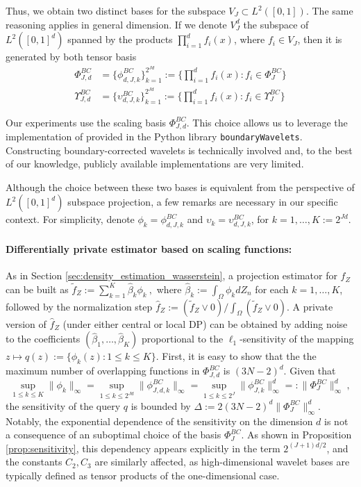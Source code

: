 \documentclass{article}
\newcommand{\1}{\mathds{1}}
\theoremstyle{plain}
\theoremstyle{definition}
\theoremstyle{remark}
\begin{document}
Thus, we obtain two distinct bases for the subspace $V_J \subset L^2([0,1])$. The same reasoning applies in general dimension. If we denote $V_J^d $ the subspace of $L^2([0,1]^d)$ spanned by the products $\prod_{i=1}^d f_i(x)$, where $f_i \in V_J$, then it is generated by both tensor basis
\begin{align}
    \Phi_{J,d}^{BC} &= \{\phi_{d,J,k}^{BC}\}_{k=1}^{2^{Jd}} :=  \{ \prod_{i=1}^d f_i(x) : f_i \in  \Phi_{J}^{BC} \} \\
    \Upsilon_{J,d}^{BC} &= \{\upsilon_{d,J,k}^{BC}\}_{k=1}^{2^{Jd}} := \{ \prod_{i=1}^d f_i(x) : f_i \in  \Upsilon_{J}^{BC} \}     
\end{align}

Our experiments use the scaling basis $\Phi_{J,d}^{BC}$. This choice allows us to leverage the implementation of \cite{holm2020orthonormal} provided in the Python library \texttt{boundaryWavelets}. 
Constructing boundary-corrected wavelets is technically involved and, to the best of our knowledge, publicly available  implementations are very limited.

Although the choice between these two bases is equivalent from the perspective of $L^2([0,1]^d)$ subspace projection, a few remarks are necessary in our specific context. For simplicity, denote $\phi_k = \phi_{d,J,k}^{BC}$ and $\upsilon_k = \upsilon_{d,J,k}^{BC}$, for $k=1,\ldots, K:= 2^{Jd}$.

\paragraph{Differentially private estimator based on scaling functions:} As in Section \ref{sec:density_estimation_wasserstein}, a projection estimator for  $f_Z$ can be built as $\tilde{f}_Z := \sum_{k=1}^K \hat{\beta}_k \phi_k \ ,$ where $\hat{\beta}_k := \int_{\Omega} \phi_k dZ_n$ for each $k=1,\ldots,K$, followed by the normalization step $\hat{f}_Z := (\tilde{f}_Z \vee 0)/\int_{\Omega} (\tilde{f}_Z \vee 0)$. A private version of $\hat{f}_Z$ (under either central or local DP) can be obtained by adding noise to the coefficients $(\hat{\beta}_1, \ldots, \hat{\beta}_K)$ proportional to the $\ell_1$-sensitivity of the mapping $z \mapsto q(z) := \{ \phi_k(z) : 1 \leq k \leq K \}$. First, it is easy to show that the the maximum number of overlapping functions in $\Phi_{J,d}^{BC}$ is $(3N-2)^d$. Given that
\begin{equation}
    \sup_{1 \leq k \leq K} \|\phi_k\|_\infty = \sup_{1 \leq k \leq 2^{Jd}} \|\phi_{J,d,k}^{BC}\|_\infty =  \sup_{1 \leq k \leq 2^{J}} \|\phi_{J,k}^{BC}\|_\infty^d =: \|\Phi_J^{BC}\|_\infty^d \ ,
\end{equation}
the sensitivity of the query $q$ is bounded by $\Delta := 2 (3N-2)^d \|\Phi_J^{BC}\|_\infty^d$. Notably, the exponential dependence of the sensitivity on the dimension $d$ is not a consequence of an suboptimal choice of the basis $\Phi_J^{BC}$. As shown in Proposition \ref{prop:sensitivity}, this dependency appears explicitly in the term $2^{(J+1)d/2}$, and the constants $C_2, C_3$ are similarly affected, as high-dimensional wavelet bases are typically defined as tensor products of the one-dimensional case.
\end{document}
